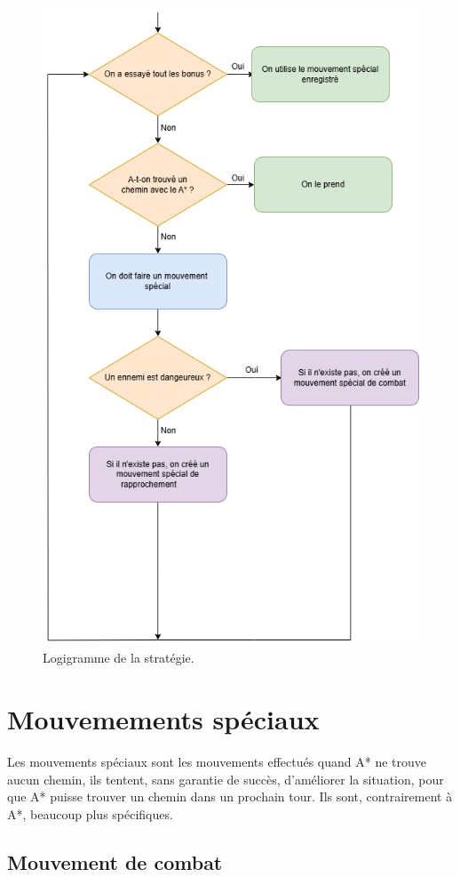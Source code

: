 \begin{figure}[!htpb]
    \centering
    \includegraphics[width=0.75\linewidth]{Figures/diagramme2.png}
    \caption[Logigramme de la stratégie.]{Logigramme de la stratégie.}
    \label{fig:logigramme}
\end{figure}

\section{Mouvemements spéciaux}

Les mouvements spéciaux sont les mouvements effectués quand A* ne trouve aucun chemin, ils tentent, sans garantie de succès, d'améliorer la situation, pour que A* puisse trouver un chemin dans un prochain tour.
\newline
Ils sont, contrairement à A*, beaucoup plus spécifiques.

\subsection{Mouvement de combat}

